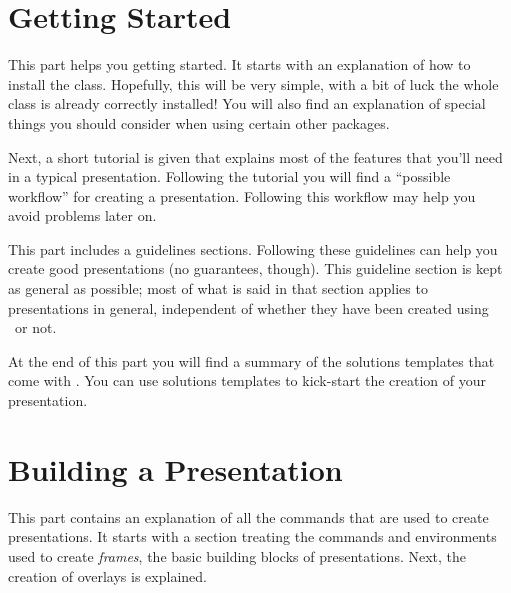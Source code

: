\documentclass{ltxdoc}
\begin{document}
\maketitle

\tableofcontents






\part{Getting Started}

This part helps you getting started. It starts with an explanation of how to install the class. Hopefully, this will be very simple, with a bit of luck the whole class is already correctly installed! You will also find an explanation of special things you should consider when using certain other packages.

Next, a short tutorial is given that explains most of the features that you'll need in a typical presentation. Following the tutorial you will find a ``possible workflow'' for creating a presentation. Following this workflow may help you avoid problems later on.

This part includes a guidelines sections. Following these guidelines can help you create good presentations (no guarantees, though). This guideline section is kept as general as possible; most of what is said in that section applies to presentations in general, independent of whether they have been created using \beamer\ or not.

At the end of this part you will find a summary of the solutions templates that come with \beamer. You can use solutions templates to kick-start the creation of your presentation.










\part{Building a Presentation}

This part contains an explanation of all the commands that are used to create presentations. It starts with a section treating the commands and environments used to create \emph{frames}, the basic building blocks of presentations. Next, the creation of overlays is explained.
\end{document}
